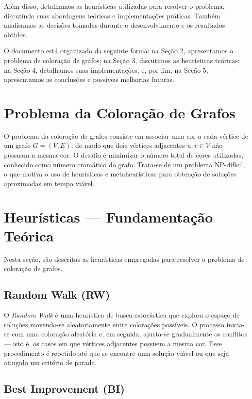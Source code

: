 \documentclass[12pt,a4paper]{article}
\begin{document}
Além disso, detalhamos as heurísticas utilizadas para resolver o problema, discutindo suas abordagens teóricas e implementações práticas. Também analisamos as decisões tomadas durante o desenvolvimento e os resultados obtidos.

O documento está organizado da seguinte forma: na Seção 2, apresentamos o problema de coloração de grafos; na Seção 3, discutimos as heurísticas teóricas; na Seção 4, detalhamos suas implementações; e, por fim, na Seção 5, apresentamos as conclusões e possíveis melhorias futuras.
\section{Problema da Coloração de Grafos}
\label{sec:problema}

O problema da coloração de grafos consiste em associar uma cor a cada vértice de um grafo \( G = (V, E) \), de modo que dois vértices adjacentes \( u, v \in V \) não possuam a mesma cor. O desafio é minimizar o número total de cores utilizadas, conhecido como número cromático do grafo. Trata-se de um problema NP-difícil, o que motiva o uso de heurísticas e metaheurísticas para obtenção de soluções aproximadas em tempo viável.

\section{Heurísticas — Fundamentação Teórica}
\label{sec:heuristicas}

Nesta seção, são descritas as heurísticas empregadas para resolver o problema de coloração de grafos.

\subsection{Random Walk (RW)}

O \textit{Random Walk} é uma heurística de busca estocástica que explora o espaço de soluções movendo-se aleatoriamente entre colorações possíveis. O processo inicia-se com uma coloração aleatória e, em seguida, ajusta-se gradualmente os conflitos — isto é, os casos em que vértices adjacentes possuem a mesma cor. Esse procedimento é repetido até que se encontre uma solução viável ou que seja atingido um critério de parada.

\subsection{Best Improvement (BI)}
\end{document}
